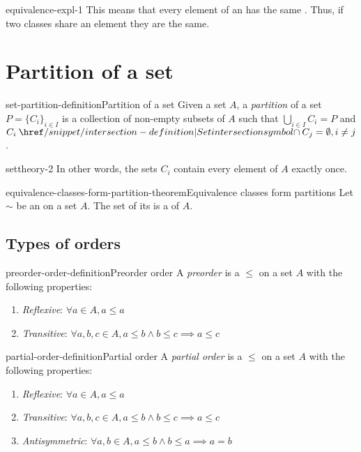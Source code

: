 \documentclass[preview]{standalone}
\begin{document}
\begin{snippet}{equivalence-expl-1}
    This means that every element of an \equivclass has the same \equivclass.
    Thus, if two classes share an element they are the same.
\end{snippet}

\section{Partition of a set}

\begin{snippetdefinition}{set-partition-definition}{Partition of a set}
    Given a set \(A\), a \textit{partition} of a set \(P={\{C_i\}}_{i\in I}\) is a collection of
    non-empty subsets of \(A\) such that \(\bigcup_{i\in I} C_i = P\) and
    \(C_i \intersection C_j = \emptyset, i \neq j\).
\end{snippetdefinition}

\begin{snippet}{settheory-2}
    In other words, the sets \(C_i\)
    contain every element of \(A\) exactly once.
\end{snippet}

\begin{snippettheorem}{equivalence-classes-form-partition-theorem}{Equivalence classes form partitions}
    Let \(\sim\) be an \equivrelation on a set \(A\).
    The set of its  is a \partition of \(A\).
\end{snippettheorem}

\subsection{Types of orders}

\begin{snippetdefinition}{preorder-order-definition}{Preorder order}
    A \textit{preorder} is a \homrelation \(\leq\) on a set \(A\)
    with the following properties:
    \begin{enumerate}
        \item \textit{Reflexive}: \(\forall a \in A, a \leq a\)
        \item \textit{Transitive}: \(\forall a,b,c \in A, a \leq b \land b \leq c \implies a \leq c\)
    \end{enumerate}
\end{snippetdefinition}

\begin{snippetdefinition}{partial-order-definition}{Partial order}
    A \textit{partial order} is a \homrelation \(\leq\) on a set \(A\)
    with the following properties:
    \begin{enumerate}
        \item \textit{Reflexive}: \(\forall a \in A, a \leq a\)
        \item \textit{Transitive}: \(\forall a,b,c \in A, a \leq b \land b \leq c \implies a \leq c\)
        \item \textit{Antisymmetric}: \(\forall a,b \in A, a \leq b \land b \leq a \implies a=b\)
    \end{enumerate}
\end{snippetdefinition}
\end{document}
